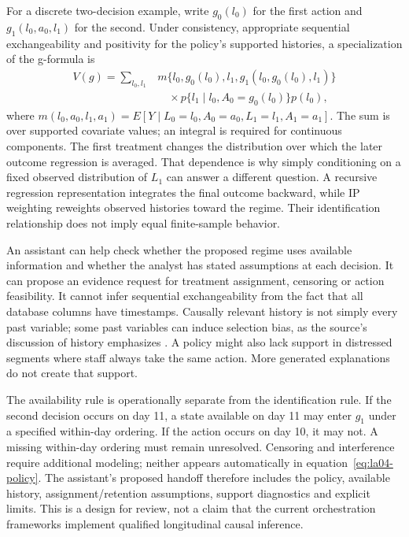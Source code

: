 For a discrete two-decision example, write
$g_0(l_0)$ for the first action and
$g_1(l_0,a_0,l_1)$ for the second. Under consistency, appropriate sequential
exchangeability and positivity for the policy's supported histories, a
specialization of the g-formula is
\begin{align}
 V(g)=\sum_{l_0,l_1}&
 m\{l_0,g_0(l_0),l_1,g_1(l_0,g_0(l_0),l_1)\}\nonumber\\
 &\quad\times p\{l_1\mid l_0,A_0=g_0(l_0)\}p(l_0),
 \label{eq:la04-policy}
\end{align}
where $m(l_0,a_0,l_1,a_1)=E[Y\mid L_0=l_0,A_0=a_0,L_1=l_1,A_1=a_1]$.
The sum is over supported covariate values; an integral is required for
continuous components. The first treatment changes the distribution over which
the later outcome regression is averaged. That dependence is why simply
conditioning on a fixed observed distribution of $L_1$ can answer a different
question. A recursive regression representation integrates the final outcome
backward, while IP weighting reweights observed histories toward the regime.
Their identification relationship does not imply equal finite-sample behavior.

An assistant can help check whether the proposed regime uses available
information and whether the analyst has stated assumptions at each decision.
It can propose an evidence request for treatment assignment, censoring or action
feasibility. It cannot infer sequential exchangeability from the fact that all
database columns have timestamps. Causally relevant history is not simply every
past variable; some past variables can induce selection bias, as the source's
discussion of history emphasizes \citep{hernan2020}. A policy might also lack
support in distressed segments where staff always take the same action.
More generated explanations do not create that support.

The availability rule is operationally separate from the identification rule.
If the second decision occurs on day 11, a state available on day 11 may enter
$g_1$ under a specified within-day ordering. If the action occurs on day 10, it
may not. A missing within-day ordering must remain unresolved. Censoring and
interference require additional modeling; neither appears automatically in
equation~\eqref{eq:la04-policy}. The assistant's proposed handoff therefore
includes the policy, available history, assignment/retention assumptions,
support diagnostics and explicit limits. This is a design for review, not a
claim that the current orchestration frameworks implement qualified
longitudinal causal inference.

